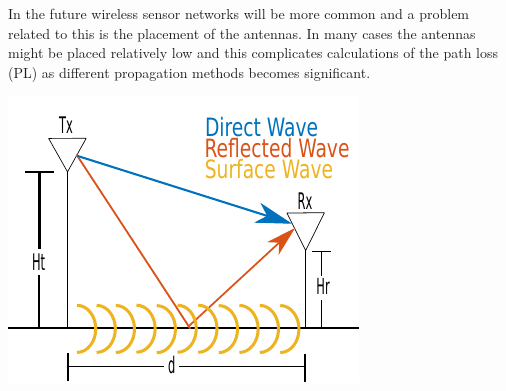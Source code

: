 \large


In the future wireless sensor networks will be more common and a problem related to this is the placement of the antennas. In many cases the antennas might be placed relatively low and this complicates calculations of the path loss (PL) as different propagation methods becomes significant. 

\begin{center}
\includegraphics[scale=1.2]{pix/poster_cropped_1.pdf}
\label{fig:name}
\end{center}

